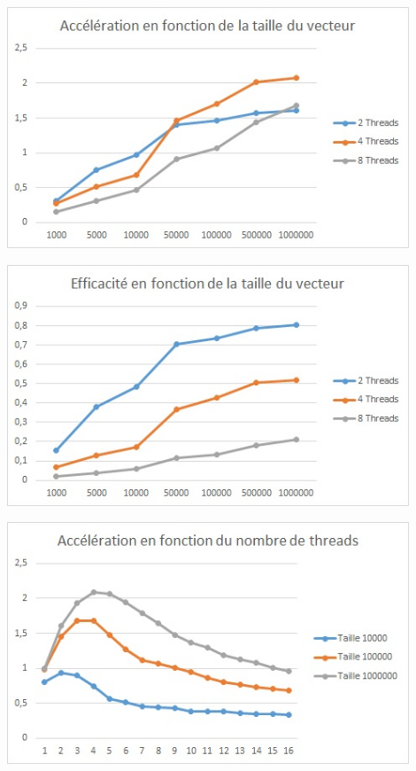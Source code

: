 \documentclass{article}
\begin{document}
\begin{center}
\includegraphics[width=12cm]{AccelerationTaille.jpg}
\vspace{2cm}

\includegraphics[width=12cm]{EfficaciteTaille.jpg}

\includegraphics[width=12cm]{AccelerationThreads.jpg}
\vspace{2cm}


\end{center}
\end{document}

